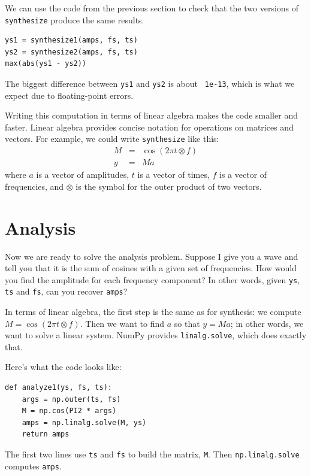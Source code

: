 \documentclass[12pt]{book}
\begin{document}
We can use the code from the previous section to check that the two
versions of {\tt synthesize} produce the same results.

\begin{verbatim}
ys1 = synthesize1(amps, fs, ts)
ys2 = synthesize2(amps, fs, ts)
max(abs(ys1 - ys2))
\end{verbatim}

The biggest difference between {\tt ys1} and {\tt ys2} is about {\tt
  1e-13}, which is what we expect due to floating-point errors.

Writing this computation in terms of linear algebra makes the code
smaller and faster.  Linear algebra
provides concise notation for operations on matrices and vectors.  For
example, we could write {\tt synthesize} like this:
%
\begin{eqnarray*}
M &=& \cos (2 \pi t \otimes f) \\
y &=& M a
\end{eqnarray*}
%
where $a$ is a vector of amplitudes,
$t$ is a vector of times, $f$ is a vector of frequencies, and
$\otimes$ is the symbol for the outer product of two vectors.


\section{Analysis}
\label{analysis}

Now we are ready to solve the analysis problem.  Suppose I give you
a wave and tell you that it is the sum of cosines with a given set
of frequencies.  How would you find the amplitude for each frequency
component?  In other words, given {\tt ys}, {\tt ts} and {\tt fs},
can you recover {\tt amps}?

In terms of linear algebra, the first step is the same as for
synthesis: we compute $M = \cos (2 \pi t \otimes f)$.  Then we want
to find $a$ so that $y = M a$; in other words, we want to solve a
linear system.  NumPy provides {\tt linalg.solve}, which does
exactly that.

Here's what the code looks like:

\begin{verbatim}
def analyze1(ys, fs, ts):
    args = np.outer(ts, fs)
    M = np.cos(PI2 * args)
    amps = np.linalg.solve(M, ys)
    return amps
\end{verbatim}

The first two lines use {\tt ts} and {\tt fs} to build the
matrix, {\tt M}.  Then {\tt np.linalg.solve} computes {\tt amps}.
\end{document}
